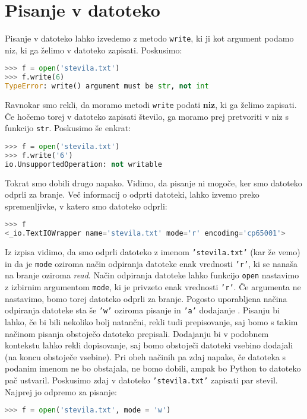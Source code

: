 \section{Pisanje v datoteko}

Pisanje v datoteko lahko izvedemo z metodo \texttt{write}, ki ji kot argument podamo niz, ki ga želimo v datoteko zapisati. Poskusimo:
\begin{lstlisting}[language=Python, showstringspaces=false]
>>> f = open('stevila.txt')
>>> f.write(6)
TypeError: write() argument must be str, not int
\end{lstlisting}
Ravnokar smo rekli, da moramo metodi \texttt{write} podati \textbf{niz}, ki ga želimo zapisati. Če hočemo torej v datoteko zapisati število, ga moramo prej pretvoriti v niz s funkcijo \texttt{str}. Poskusimo še enkrat: 
\begin{lstlisting}[language=Python, showstringspaces=false]
>>> f = open('stevila.txt')
>>> f.write('6')
io.UnsupportedOperation: not writable
\end{lstlisting}
Tokrat smo dobili drugo napako. Vidimo, da pisanje ni mogoče, ker smo datoteko odprli za branje. Več informacij o odprti datoteki, lahko izvemo preko spremenljivke, v katero smo datoteko odprli:
\begin{lstlisting}[language=Python, showstringspaces=false]
>>> f
<_io.TextIOWrapper name='stevila.txt' mode='r' encoding='cp65001'>
\end{lstlisting}
Iz izpisa vidimo, da smo odprli datoteko z imenom \texttt{'stevila.txt'} (kar že vemo) in da je \texttt{mode} oziroma način odpiranja datoteke enak vrednosti \texttt{'r'}, ki se nanaša na branje oziroma \emph{read}. Način odpiranja datoteke lahko funkcijo \texttt{open} nastavimo z izbirnim argumentom \texttt{mode}, ki je privzeto enak vrednosti \texttt{'r'}. Če argumenta ne nastavimo, bomo torej datoteko odprli za branje. Pogosto uporabljena načina odpiranja datoteke sta še \texttt{'w'} oziroma pisanje  in \texttt{'a'} dodajanje . Pisanju bi lahko, če bi bili nekoliko bolj natančni, rekli tudi prepisovanje, saj bomo s takim načinom pisanja obstoječo datoteko prepisali. Dodajanju bi v podobnem kontekstu lahko rekli dopisovanje, saj bomo obstoječi datoteki vsebino dodajali (na koncu obstoječe vsebine). Pri obeh načinih pa zdaj napake, če datoteka s podanim imenom ne bo obstajala, ne bomo dobili, ampak bo Python to datoteko pač ustvaril. Poskusimo zdaj v datoteko \texttt{'stevila.txt'} zapisati par stevil. Najprej jo odpremo za pisanje:
\begin{lstlisting}[language=Python, showstringspaces=false]
>>> f = open('stevila.txt', mode = 'w')
\end{lstlisting}
